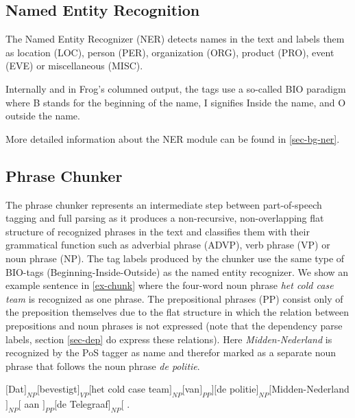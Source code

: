 \documentclass{book}
\begin{document}
\subsection{Named Entity Recognition}
\label{sec-ner}

The Named Entity Recognizer (NER) detects names in the text and labels them as
location (\textsc{LOC}), person (\textsc{PER}), organization (\textsc{ORG}), product (\textsc{PRO}), event (\textsc{EVE}) or
miscellaneous (\textsc{MISC}).

Internally and in Frog's columned output, the tags use a so-called BIO paradigm where B stands for the beginning of the name, I signifies Inside the name, and O outside the name.

More detailed information about the NER module can be found in \ref{sec-bg-ner}.


\subsection{Phrase Chunker}
\label{sec-chunker}

The phrase chunker represents an intermediate step between part-of-speech tagging and full parsing as it produces a non-recursive, non-overlapping flat structure of recognized phrases in the text and classifies them with their grammatical function such as adverbial phrase (ADVP), verb phrase (VP) or noun phrase (NP). The tag labels produced by the chunker use the same type of BIO-tags (Beginning-Inside-Outside) as the named entity recognizer.
We show an example sentence in \ref{ex-chunk} where the four-word noun phrase {\it het cold case team} is recognized as one phrase. The prepositional phrases (PP) consist only of the preposition themselves due to the flat structure in which the relation between prepositions and noun phrases is not expressed (note that the dependency parse labels, section \ref{sec-dep} do express these relations). Here {\it Midden-Nederland} is recognized by the PoS tagger as name and therefor marked as a separate noun phrase that follows the noun phrase {\it de politie}.

\begin{example}
$[$Dat$]_{NP} [$bevestigt$]_{VP} [$het cold case team$]_{NP} [$van$]_{PP}] [$de politie$]_{NP} [$Midden-Nederland$]_{NP} [$ aan $]_{PP} [$de Telegraaf$]_{NP} [$ .
\end{example}
\end{document}
